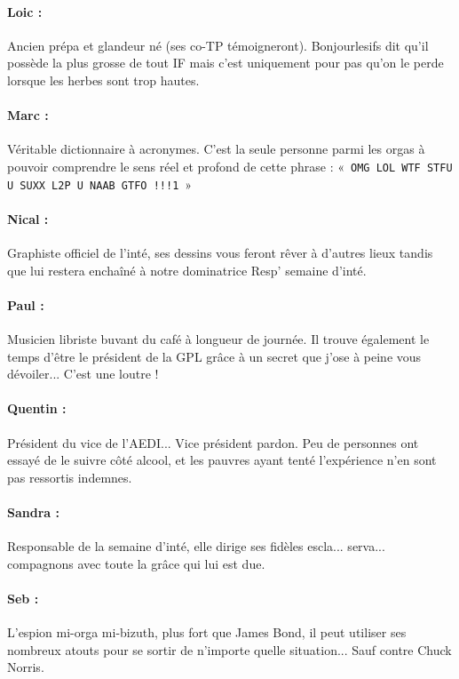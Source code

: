 \paragraph{Loic :} Ancien prépa et glandeur né (ses co-TP témoigneront). Bonjourlesifs dit qu'il possède la plus grosse de tout IF mais c'est uniquement pour pas qu'on le perde lorsque les herbes sont trop hautes.
\paragraph{Marc :} Véritable dictionnaire à acronymes. C'est la seule personne parmi les orgas à pouvoir comprendre le sens réel et profond de cette phrase : «~\texttt{OMG LOL WTF STFU U SUXX L2P U NAAB GTFO !!!1}~»
\paragraph{Nical :} Graphiste officiel de l'inté, ses dessins vous feront rêver à d'autres lieux tandis que lui restera enchaîné à notre dominatrice Resp' semaine d'inté.
\paragraph{Paul :} Musicien libriste buvant du café à longueur de journée. Il trouve également le temps d'être le président de la GPL grâce à un secret que j'ose à peine vous dévoiler... C'est une loutre !
\paragraph{Quentin :} Président du vice de l'AEDI... Vice président pardon. Peu de personnes ont essayé de le suivre côté alcool, et les pauvres ayant tenté l'expérience n'en sont pas ressortis indemnes.
\paragraph{Sandra :} Responsable de la semaine d'inté, elle dirige ses fidèles escla... serva... compagnons avec toute la grâce qui lui est due.
\vspace{0.5cm}
\paragraph{Seb :} L'espion mi-orga mi-bizuth, plus fort que James Bond, il peut utiliser ses nombreux atouts pour se sortir de n'importe quelle situation... Sauf contre Chuck Norris.
\vfill
\columnbreak
{}
